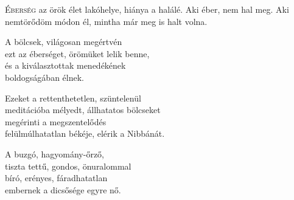 
\vspace*{-\baselineskip}

\begin{firstdhpverse}[-2.5pt]{21}
\lettrine{É}{berség} {\LettrineTextFont az örök élet lakóhelye,}\newline
hiánya a halálé.\newline
Aki éber, nem hal meg.\newline
Aki nemtörődöm módon él,\newline
mintha már meg is halt volna.
\end{firstdhpverse}

\begin{dhpverse}

 A bölcsek, világosan megértvén\\
ezt az éberséget, örömüket lelik benne,\\
és a kiválasztottak menedékének\\
boldogságában élnek.

 Ezeket a rettenthetetlen, szüntelenül\\
meditációba mélyedt, állhatatos bölcseket\\
megérinti a megszentelődés\\
felülmúlhatatlan békéje, elérik a Nibbánát.

 A buzgó, hagyomány-őrző,\\
tiszta tettű, gondos, önuralommal\\
bíró, erényes, fáradhatatlan\\
embernek a dicsősége egyre nő.

\end{dhpverse}
\newpage
